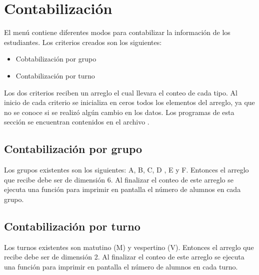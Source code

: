 \section{Contabilización}

El menú contiene diferentes modos para contabilizar la información de los estudiantes. Los criterios creados son los siguientes:

\begin{itemize}
    \item Cobtabilización por grupo
    \item Contabilización por turno
\end{itemize}

Los dos criterios reciben un arreglo el cual llevara el conteo de cada tipo. Al inicio de cada criterio se inicializa en ceros todos los elementos del arreglo, ya que no se conoce si se realizó algún cambio en los datos. Los programas de esta sección se encuentran contenidos en el archivo .

\subsection{Contabilización por grupo}

Los grupos existentes son los siguientes: A, B, C, D , E y F. Entonces el arreglo que recibe debe ser de dimensión 6. Al finalizar el conteo de este arreglo se ejecuta una función para imprimir en pantalla el número de alumnos en cada grupo.

\subsection{Contabilización por turno}

Los turnos existentes son matutino (M) y vespertino (V). Entonces el arreglo que recibe debe ser de dimensión 2. Al finalizar el conteo de este arreglo se ejecuta una función para imprimir en pantalla el número de alumnos en cada turno.